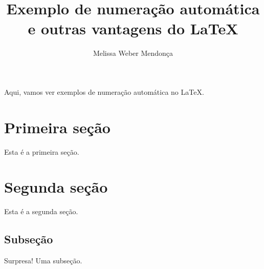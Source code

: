\documentclass{article}
\author{Melissa Weber Mendonça}
\title{Exemplo de numeração automática\\e outras vantagens do \LaTeX}
\begin{document}
\maketitle


Aqui, vamos ver exemplos de numeração automática no \LaTeX. 

\section{Primeira seção\label{primeira}}

Esta é a primeira seção.




\section{Segunda seção}

Esta é a segunda seção.

\subsection{Subseção}

Surpresa! Uma subseção.
\end{document}
